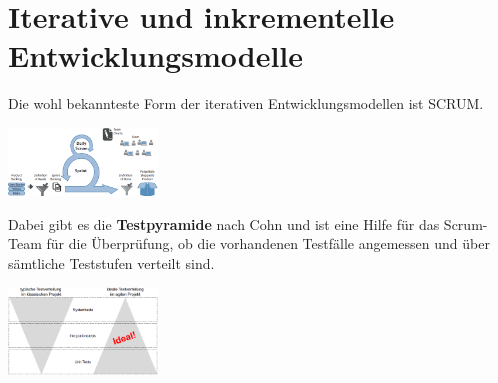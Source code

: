 \documentclass{report}
\newenvironment{Figure}
	{\par\medskip\noindent\minipage{\linewidth}}
	{\endminipage\par\medskip}
\theoremstyle{definition}
\theoremstyle{example}
\begin{document}
\section{Iterative und inkrementelle Entwicklungsmodelle}
Die wohl bekannteste Form der iterativen Entwicklungsmodellen ist SCRUM.
\begin{Figure}
   \centering
    \includegraphics[width=150px]{img/Scrum.png}
        \label{fig:Scrum}
\end{Figure}
Dabei gibt es die \textbf{Testpyramide} nach Cohn und ist eine Hilfe für das Scrum-Team für die Überprüfung, ob die vorhandenen Testfälle angemessen und über sämtliche Teststufen verteilt sind.
\begin{Figure}
   \centering
    \includegraphics[width=150px]{img/Testpyramide.png}
        \label{fig:Die Testpyramide nach Cohn}
\end{Figure}
\end{document}
